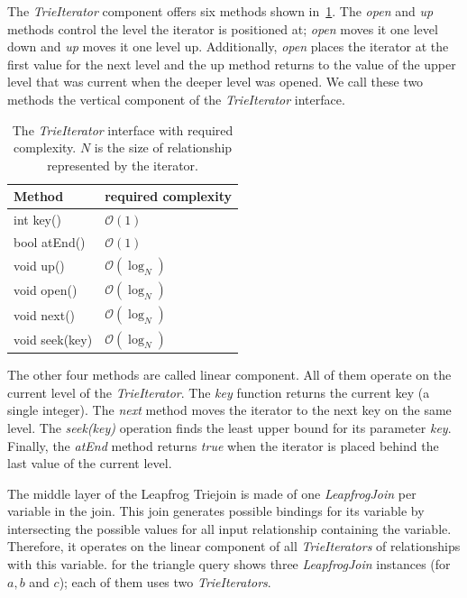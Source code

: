 The \textit{TrieIterator} component offers six methods shown in~\cref{table:trieIterator-interface}.
The \textit{open} and \textit{up} methods control the level the iterator is positioned at;
\textit{open} moves it one level down and \textit{up} moves it one level up.
Additionally, \textit{open} places the iterator at the first value for the next level and the up
method returns to the value of the upper level that was current when the deeper level was opened.
We call these two methods the vertical component of the \textit{TrieIterator} interface.

\begin{table}
    \centering
    \begin{tabular}{@{}ll@{}}
        \toprule
        Method         & required complexity    \\
        \midrule
        int key()      &  $\mathcal{O}(1)$       \\
        bool atEnd()   &  $\mathcal{O}(1)$       \\
        void up()      &  $\mathcal{O}(\log_N)$  \\
        void open()    &  $\mathcal{O}(\log_N)$  \\
        void next()    &  $\mathcal{O}(\log_N)$  \\
        void seek(key) &  $\mathcal{O}(\log_N)$  \\
        \bottomrule
    \end{tabular}
    \caption{
      The \textit{TrieIterator} interface with required complexity.
      $N$ is the size of relationship represented by the iterator.
    }
    \label{table:trieIterator-interface}
\end{table}

The other four methods are called linear component.
All of them operate on the current level of the \textit{TrieIterator}.
The \textit{key} function returns the current key (a single integer).
The \textit{next} method moves the iterator to the next key on the same level.
The \textit{seek(key)} operation finds the least upper bound for its parameter \textit{key}.
Finally, the \textit{atEnd} method returns \textit{true} when the iterator is placed behind the last value of the current level.

The middle layer of the Leapfrog Triejoin is made of one \textit{LeapfrogJoin} per variable in the join.
This join generates possible bindings for its variable by intersecting the possible values for all input relationship containing the
variable.
Therefore, it operates on the linear component of all \textit{TrieIterators} of relationships with this variable.
 for the triangle query shows three \textit{LeapfrogJoin} instances (for $a, b$ and $c$);
each of them uses two \textit{TrieIterators}.

